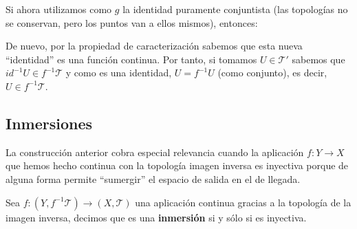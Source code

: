 \begin{demo}
\begin{itemize}
   Si ahora utilizamos como $g$ la identidad puramente conjuntista (las topologías no se conservan, pero los puntos van a ellos mismos), entonces:
    \begin{figure}[H]
        \centering    
    \end{figure}
    De nuevo, por la propiedad de caracterización sabemos que esta nueva ``identidad'' es una función continua. Por tanto, si tomamos $U \in \mathcal{T}'$ sabemos que $id^{-1}U \in f^{-1}\mathcal{T}$ y como es una identidad, $U = f^{-1}U$ (como conjunto), es decir, $U \in f^{-1}\mathcal{T}$.
\end{itemize}
\end{demo}

\subsection{Inmersiones}
\label{sub:inmersiones}
La construcción anterior cobra especial relevancia cuando la aplicación $f: Y \rightarrow X$ que hemos hecho continua con la topología imagen inversa es inyectiva porque de alguna forma permite ``sumergir'' el espacio de salida en el de llegada.

\begin{defi}[Inmersión]
Sea $f:\left( Y, f^{-1}\mathcal{T} \right) \rightarrow \left( X, \mathcal{T} \right)$ una aplicación continua gracias a la topología de la imagen inversa, decimos que es una \textbf{inmersión} si y sólo si es inyectiva.
\end{defi}

